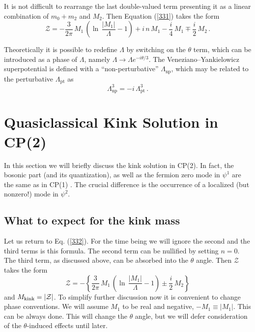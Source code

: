 \documentclass[epsfig,12pt]{article}
\def\beq{\begin{equation}}
\def\eeq{\end{equation}}
\def\beq{\begin{equation}}
\def\eeq{\end{equation}}
\newcommand{\mc}[1]{\mathcal{#1}}
\begin{document}
It is not difficult to rearrange the last double-valued term presenting it as a linear combination of $m_0+m_2$ and $M_2$.
Then Equation (\ref{331}) takes the form
\beq
   \mc{Z} = 
-
       \frac{3}{2\pi}\, M_1\, \left(  \ln\, \frac {   |M_1|   }
                                                 {  \Lambda  } -1 \right) +i\,n \, M_1
                                                 -\frac{i}{4} \, M_1 \mp \frac{i}{2}\, M_2\,.
                                                 \label{332}
\eeq


       Theoretically it is possible to redefine $ \Lambda $ by switching on the $\theta$ term,
       which can be introduced as a phase of $\Lambda$, namely $\Lambda \to \Lambda e^{-i\theta /3}$.
       The Veneziano--Yankielowicz superpotential is defined with a ``non-perturbative'' 
       $ \Lambda_\text{np} $, which may be related to the perturbative $ \Lambda_\text{pt} $ as
       \beq
       \Lambda_\text{np}^3 =  -i \, \Lambda_\text{pt}^3\,. 
       \eeq
       





\section{Quasiclassical Kink Solution in CP(2)}
\setcounter{equation}{0}
\label{kinksolu}

In this section we will briefly discuss the kink solution in CP(2). In fact, the bosonic part (and its quantization), 
as well as the fermion zero mode in $\psi^1$ are the same as in CP(1) \cite{Shifman:2007ce}. The crucial difference is the occurrence of a localized (but nonzero!) mode in $\psi^2$.

\subsection{What to expect for the kink mass}

Let us return to Eq. (\ref{332}). For the time being we will ignore the second and the third terms is this formula.
The second term can be nullified by setting $n=0$. The third term, as discussed above,
can be absorbed into the $\theta$ angle. Then $\mc{Z} $ takes the form 
\beq
\mc{Z} = -\left\{  \frac{3}{2\pi}\, M_1\, \left(  \ln\, \frac {   |M_1|   }
                                                 {  \Lambda  } -1 \right) 
                                                 \pm
                                                 \frac{i}{2}\, M_2
                                                 \right\} 
                                                 \label{41}
\eeq
and $M_{\rm kink} = |\mc{Z}|$. To simplify further discussion now it is convenient  to change phase conventions.
We will assume $M_1$ to be real and negative, $-M_1\equiv |M_1|$. This can be always done. This will change the $\theta$ angle, but we will 
defer consideration of  the $\theta$-induced effects until later.
\end{document}
